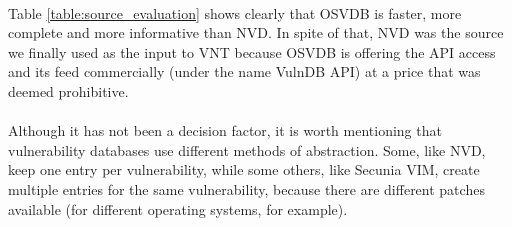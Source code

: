 \paragraph{}
Table \ref{table:source_evaluation} shows clearly that OSVDB is faster, more complete and more informative than NVD. In spite of that, NVD was the source we finally used as the input to VNT because OSVDB is offering the API access and its feed commercially (under the name VulnDB API) at a price that was deemed prohibitive.
\paragraph{}
Although it has not been a decision factor, it is worth mentioning that vulnerability databases use different methods of abstraction. Some, like NVD, keep one entry per vulnerability, while some others, like Secunia VIM, create multiple entries for the same vulnerability, because there are different patches available (for different operating systems, for example).



